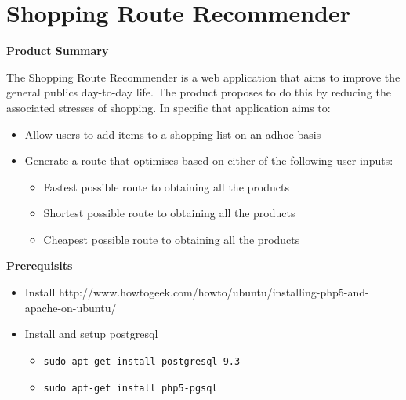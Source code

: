 \documentclass[10pt, a4paper, onecolumn]{scrartcl}
\begin{document}
	
	\section{Shopping Route Recommender}\label{shopping-route-recommender}
	
%		
	
	\textbf{Product Summary}
	
	The Shopping Route Recommender is a web application that aims to improve
	the general publics day-to-day life. The product proposes to do this by
	reducing the associated stresses of shopping. In specific that
	application aims to:
	
	\begin{itemize}
		\item
		Allow users to add items to a shopping list on an adhoc basis
		\item
		Generate a route that optimises based on either of the following user
		inputs:
		
		\begin{itemize}
			\item
			Fastest possible route to obtaining all the products
			\item
			Shortest possible route to obtaining all the products
			\item
			Cheapest possible route to obtaining all the products
		\end{itemize}
	\end{itemize}
	
	\textbf{Prerequisits}
	
	\begin{itemize}[noitemsep]
		\item
		Install
		http://www.howtogeek.com/howto/ubuntu/installing-php5-and-apache-on-ubuntu/
		\item
		Install and setup postgresql
		
		\begin{itemize}[noitemsep]
			\item
			\texttt{sudo\ apt-get\ install\ postgresql-9.3}
			\item
			\texttt{sudo\ apt-get\ install\ php5-pgsql}
		\end{itemize}
	\end{itemize}
	
\end{document}

